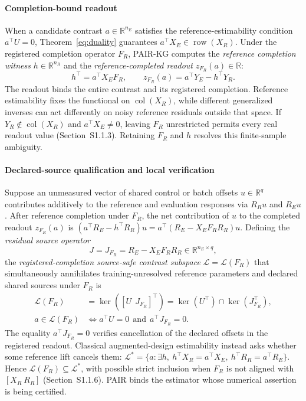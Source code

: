\documentclass[preprint,12pt,number,sort&compress]{elsarticle}
\newcommand{\pairkg}{PAIR-KG\xspace}
\newcommand{\R}{\mathbb{R}}
\DeclareMathOperator{\col}{col}
\DeclareMathOperator{\row}{row}
\begin{document}
\paragraph{Completion-bound readout}
When a candidate contrast $a \in \R^{n_E}$ satisfies the reference-estimability condition $a^\top U = 0$, Theorem~\ref{eq:duality} guarantees $a^\top X_E \in \row(X_R)$. Under the registered completion operator $F_R$, \pairkg computes the \emph{reference completion witness} $h \in \R^{n_R}$ and the \emph{reference-completed readout} $z_{F_R}(a) \in \R$:
\begin{equation}\label{eq:readout}
h^\top = a^\top X_E F_R, \qquad z_{F_R}(a) = a^\top Y_E - h^\top Y_R.
\end{equation}
The readout binds the entire contrast and its registered completion. Reference estimability fixes the functional on $\col(X_R)$, while different generalized inverses can act differently on noisy reference residuals outside that space. If $Y_R\notin\col(X_R)$ and $a^\top X_E\ne0$, leaving $F_R$ unrestricted permits every real readout value (Section~S1.1.3). Retaining $F_R$ and $h$ resolves this finite-sample ambiguity.

\paragraph{Declared-source qualification and local verification}
Suppose an unmeasured vector of shared control or batch offsets $u \in \R^q$ contributes additively to the reference and evaluation responses via $R_R u$ and $R_E u$. After reference completion under $F_R$, the net contribution of $u$ to the completed readout $z_{F_R}(a)$ is $(a^\top R_E - h^\top R_R)u = a^\top (R_E - X_E F_R R_R) u$. Defining the \emph{residual source operator}
\[
J = J_{F_R} = R_E - X_E F_R R_R \in \R^{n_E \times q},
\]
the \emph{registered-completion source-safe contrast subspace} $\mathcal{L} = \mathcal{L}(F_R)$ that simultaneously annihilates training-unresolved reference parameters and declared shared sources under $F_R$ is
\begin{equation}\label{eq:jointgate}
\begin{aligned}
\mathcal{L}(F_R) &= \ker([U\ \ J_{F_R}]^\top) = \ker(U^\top) \cap \ker(J_{F_R}^\top),\\
a \in \mathcal{L}(F_R) &\iff a^\top U = 0 \ \ \text{and}\ \ a^\top J_{F_R} = 0.
\end{aligned}
\end{equation}
The equality $a^\top J_{F_R}=0$ verifies cancellation of the declared offsets in the registered readout. Classical augmented-design estimability instead asks whether some reference lift cancels them: $\mathcal L^*=\{a:\exists h,\ h^\top X_R=a^\top X_E,\ h^\top R_R=a^\top R_E\}$. Hence $\mathcal L(F_R)\subseteq\mathcal L^*$, with possible strict inclusion when $F_R$ is not aligned with $[X_R\ R_R]$ (Section~S1.1.6). PAIR binds the estimator whose numerical assertion is being certified.
\end{document}
